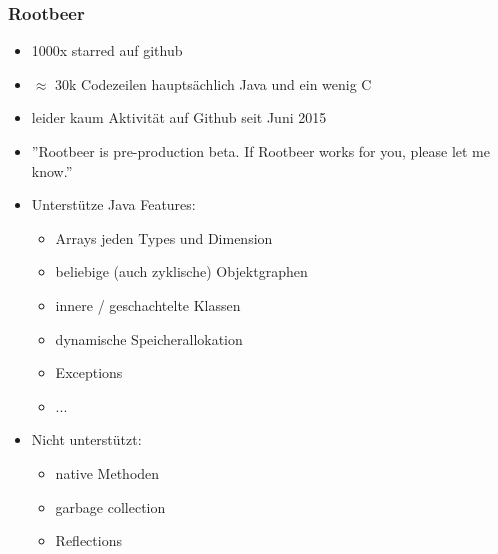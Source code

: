 \begin{frame}
    \frametitle{Rootbeer}
    \begin{itemize}
        \item 1000x starred auf github
        \item $\approx$ 30k Codezeilen hauptsächlich Java und ein wenig C %
        \item leider kaum Aktivität auf Github seit Juni 2015 %
        \item ''Rootbeer is pre-production beta. If Rootbeer works for you, please let me know.''
        \item Unterstütze Java Features:
        \begin{itemize}
            \item Arrays jeden Types und Dimension
            \item beliebige (auch zyklische) Objektgraphen
            \item innere / geschachtelte Klassen
            \item dynamische Speicherallokation
            \item Exceptions
            \item ...
        \end{itemize}
        \item Nicht unterstützt:
        \begin{itemize}
            \item native Methoden %
            \item garbage collection
            \item Reflections
        \end{itemize}
    \end{itemize}
\end{frame}


